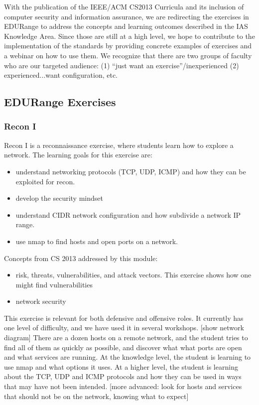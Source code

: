 With the publication of the IEEE/ACM CS2013 Curricula and its inclusion of computer security and 
information assurance, we are redirecting the exercises in EDURange to address the concepts and learning 
outcomes described in the IAS Knowledge Area.  Since those are still at a high level, we hope to contribute
to the implementation of the standards by providing concrete examples of exercises and a webinar
on how to use them.  We recognize that
there are two groups of faculty who are our targeted audience: (1) ``just want an exercise''/inexperienced
 (2) experienced...want configuration, etc.






\subsection*{EDURange Exercises}
\subsubsection{Recon I}
Recon I  is a reconnaissance exercise, where students learn how to explore a network.
The learning goals for this exercise are:
\begin{itemize}
\item understand networking protocols (TCP, UDP, ICMP) and how they can be exploited for recon.
\item develop the security mindset
\item understand CIDR network configuration and how subdivide a network IP range.
\item use nmap to find hosts and open ports on a network.
\end{itemize}
Concepts from CS 2013 addressed by this module:
\begin{itemize}
\item  risk, threats, vulnerabilities, and attack vectors.  This exercise shows how one might 
  find vulnerabilities
\item network security
\end{itemize}


This exercise is relevant for both defensive and offensive roles.  It currently has one level of difficulty,
and we have used it in several workshops.
[show network diagram]
There are a dozen hosts on a remote network, and the student tries to find all of them as quickly as 
possible, and discover what what ports are open and what services are running.  At the knowledge level,
the student is learning to use nmap and what options it uses.  At a higher level, the student is learning
about the TCP, UDP and ICMP protocols and how they can be used in ways that may have not been intended.
[more advanced: look for hosts and services that should not be on the network, knowing what to expect]

